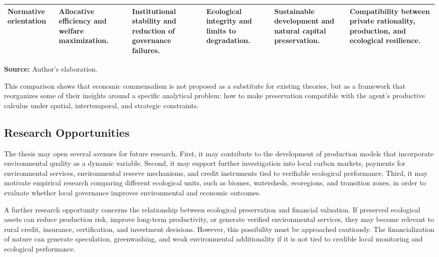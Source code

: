 \begin{table}[H]
{\begin{tabularx}{\textwidth}{lXXXXX}
\textbf{Normative orientation} 
& Allocative efficiency and welfare maximization.
& Institutional stability and reduction of governance failures.
& Ecological integrity and limits to degradation.
& Sustainable development and natural capital preservation.
& Compatibility between private rationality, production, and ecological resilience. \\

\bottomrule
\end{tabularx}}

\vspace{0.1em}
\begin{flushleft}
\footnotesize
\textbf{Source:} Author's elaboration.
\end{flushleft}

\end{table}

This comparison shows that economic commensalism is not proposed as a substitute for existing theories, but as a framework that reorganizes some of their insights around a specific analytical problem: how to make preservation compatible with the agent's productive calculus under spatial, intertemporal, and strategic constraints.

\subsection{Research Opportunities}

The thesis may open several avenues for future research. First, it may contribute to the development of production models that incorporate environmental quality as a dynamic variable. Second, it may support further investigation into local carbon markets, payments for environmental services, environmental reserve mechanisms, and credit instruments tied to verifiable ecological performance. Third, it may motivate empirical research comparing different ecological units, such as biomes, watersheds, ecoregions, and transition zones, in order to evaluate whether local governance improves environmental and economic outcomes.

A further research opportunity concerns the relationship between ecological preservation and financial valuation. If preserved ecological assets can reduce production risk, improve long-term productivity, or generate verified environmental services, they may become relevant to rural credit, insurance, certification, and investment decisions. However, this possibility must be approached cautiously. The financialization of nature can generate speculation, greenwashing, and weak environmental additionality if it is not tied to credible local monitoring and ecological performance.

